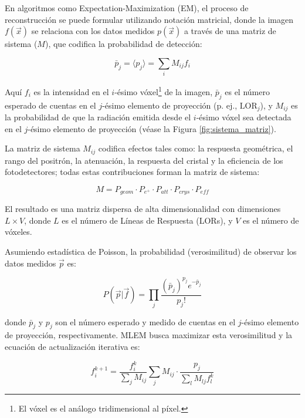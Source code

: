 En algoritmos como Expectation-Maximization (EM), el proceso de reconstrucción se puede formular utilizando notación matricial, donde la imagen $f(\vec{x})$ se relaciona con los datos medidos $p(\vec{x})$ a través de una matriz de sistema ($M$), que codifica la probabilidad de detección:

\begin{equation}
      \bar{p}_j = \langle p_j \rangle = \sum_i M_{ij} f_i
\end{equation}

Aquí $f_i$ es la intensidad en el $i$-ésimo vóxel\footnote{El vóxel es el análogo tridimensional al píxel.} de la imagen, $\bar{p}_j$ es el número esperado de cuentas en el $j$-ésimo elemento de proyección (p. ej., $\text{LOR}_j$), y $M_{ij}$ es la probabilidad de que la radiación emitida desde el $i$-ésimo vóxel sea detectada en el $j$-ésimo elemento de proyección (véase la Figura \ref{fig:sistema_matriz}).

La matriz de sistema $M_{ij}$ codifica efectos tales como: la respuesta geométrica, el rango del positrón, la atenuación, la respuesta del cristal y la eficiencia de los fotodetectores; todas estas contribuciones forman la matriz de sistema:

\begin{equation}
      M = P_{geom} \cdot P_{e^+} \cdot P_{att} \cdot P_{crys} \cdot P_{eff}
\end{equation}

El resultado es una matriz dispersa de alta dimensionalidad con dimensiones $L \times V$, donde $L$ es el número de Líneas de Respuesta (LORs), y $V$ es el número de vóxeles.

Asumiendo estadística de Poisson, la probabilidad (verosimilitud) de observar los datos medidos $\vec{p}$ es:

\begin{equation}
      P(\vec{p}|\vec{f}) = \prod_j \frac{(\bar{p}_j)^{p_j} e^{-\bar{p}_j}}{p_j!}
\end{equation}

donde $\bar{p}_j$ y $p_j$ son el número esperado y medido de cuentas en el $j$-ésimo elemento de proyección, respectivamente. MLEM busca maximizar esta verosimilitud y la ecuación de actualización iterativa es:

\begin{equation}
      f_i^{k+1} = \frac{f_i^k}{\sum_j M_{ij}} \sum_j M_{ij} \cdot \frac{p_j}{\sum_l M_{lj} f_l^k}
\end{equation}

